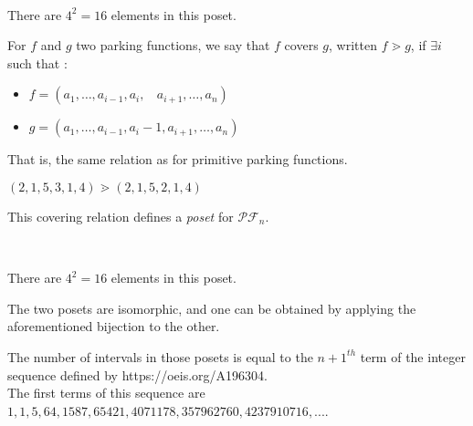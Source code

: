 \begin{example}
    ~\\
    \begin{center}
        
        There are $4^2 = 16$ elements in this poset.
    \end{center}
\end{example}

\begin{definition}[$\gtrdot$]
    For $f$ and $g$ two parking functions, we say
    that $f$ covers $g$, written $f \gtrdot g$, if
    $\exists i$ such that :
    \begin{itemize}
        \item $f = (a_1, \ldots, a_{i-1}, a_i,\ \ \ \ 
            a_{i+1}, \ldots, a_n)$
        \item $g = (a_1, \ldots, a_{i-1}, a_i - 1, a_{i+1},
        \ldots, a_n)$
    \end{itemize}
    That is, the same relation as for primitive
    parking functions.
\end{definition}

\begin{example}[$n = 6$]
    $(2, 1, 5, 3, 1, 4) \gtrdot (2, 1, 5, 2, 1, 4)$    
\end{example}

\begin{prop}
    This covering relation defines a \emph{poset}
    for $\mathcal{PF}_n$.
\end{prop}

\begin{example}
    ~\\
    \begin{center}
        
        There are $4^2 = 16$ elements in this poset.
    \end{center}
\end{example}

\begin{rem}
    The two posets are isomorphic, and one can be obtained by
    applying the aforementioned bijection to the other.
\end{rem}

\begin{theorem}
    The number of intervals in those posets is equal to
    the $n+1^{th}$ term of the integer sequence defined by
    https://oeis.org/A196304.\\
    The first terms of this sequence are $1, 1, 5, 64, 1587,
    65421, 4071178, 357962760, 4237910716, ...$.
\end{theorem}